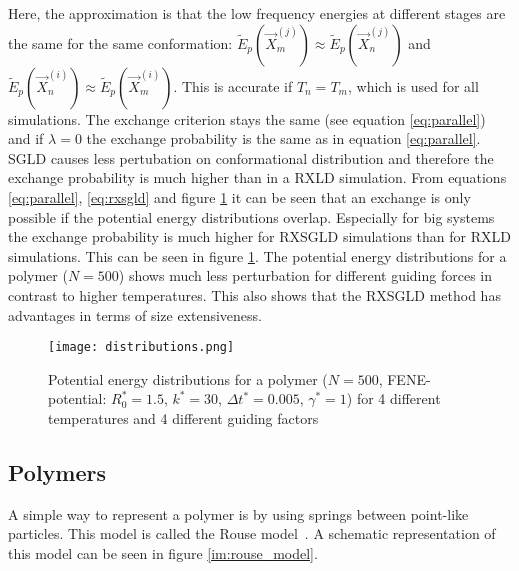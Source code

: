 \documentclass[a4paper]{article}
\begin{document}
Here, the approximation is that the low frequency energies at different stages are the same for the same conformation: $\tilde{E}_p \left( \vec{X}_m^{(j)} \right) \approx \tilde{E}_p \left( \vec{X}_n^{(j)} \right)$ and $\tilde{E}_p \left( \vec{X}_n^{(i)} \right) \approx \tilde{E}_p \left( \vec{X}_m^{(i)} \right)$. This is accurate if $T_n = T_m$, which is used for all simulations. The exchange criterion stays the same (see equation \ref{eq:parallel}) and if $\lambda = 0$ the exchange probability is the same as in equation \ref{eq:parallel}. SGLD causes less pertubation on conformational distribution and therefore the exchange probability is much higher than in a RXLD simulation. From equations \ref{eq:parallel}, \ref{eq:rxsgld} and figure \ref{im:distributions} it can be seen that an exchange is only possible if the potential energy distributions overlap. Especially for big systems the exchange probability is much higher for RXSGLD simulations than for RXLD simulations. This can be seen in figure \ref{im:distributions}. The potential energy distributions for a polymer ($N = 500$) shows much less perturbation for different guiding forces in contrast to higher temperatures. This also shows that the RXSGLD method has advantages in terms of size extensiveness.

\begin{figure} [H]
\centering
\texttt{[image: distributions.png]}
\caption{Potential energy distributions for a polymer ($N = 500$, FENE-potential: $R_0^* = 1.5$, $k^* = 30$, $\Delta t^* = 0.005$, $\gamma^* = 1$) for 4 different temperatures and 4 different guiding factors}
\label{im:distributions}
\end{figure}

\subsection{Polymers}

A simple way to represent a polymer is by using springs between point-like particles. This model is called the Rouse model~\cite{Rouse1953}. A schematic representation of this model can be seen in figure \ref{im:rouse_model}.
\end{document}
